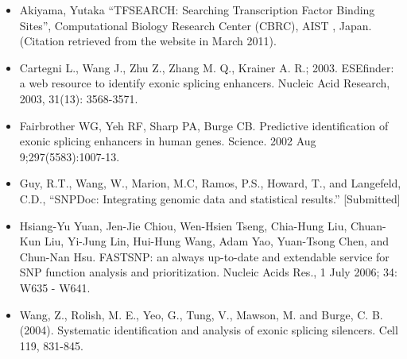 \documentclass[11pt]{article}
\begin{document}
\begin{itemize}
\item Akiyama, Yutaka ``TFSEARCH: Searching Transcription Factor Binding Sites'',
    Computational Biology Research Center (CBRC), AIST , Japan. (Citation
    retrieved from the website in March 2011).
\item Cartegni L., Wang J., Zhu Z., Zhang M. Q., Krainer A. R.; 2003.  ESEfinder:
    a web resource to identify exonic splicing enhancers.  Nucleic Acid
    Research, 2003, 31(13): 3568-3571.
\item Fairbrother WG, Yeh RF, Sharp PA, Burge CB. Predictive identification of
    exonic splicing enhancers in human genes. Science. 2002 Aug
    9;297(5583):1007-13.
\item Guy, R.T., Wang, W., Marion, M.C, Ramos, P.S., Howard, T., and Langefeld,
    C.D., ``SNPDoc: Integrating genomic data and statistical results.''
    [Submitted]
\item Hsiang-Yu Yuan, Jen-Jie Chiou, Wen-Hsien Tseng, Chia-Hung Liu, Chuan-Kun
    Liu, Yi-Jung Lin, Hui-Hung Wang, Adam Yao, Yuan-Tsong Chen, and Chun-Nan
    Hsu.  FASTSNP: an always up-to-date and extendable service for SNP function
    analysis and prioritization. Nucleic Acids Res., 1 July 2006; 34: W635 -
    W641.
\item Wang, Z., Rolish, M. E., Yeo, G., Tung, V., Mawson, M. and Burge,
    C. B. (2004). Systematic identification and analysis of exonic splicing
    silencers. Cell 119, 831-845.
\end{itemize}
\end{document}
